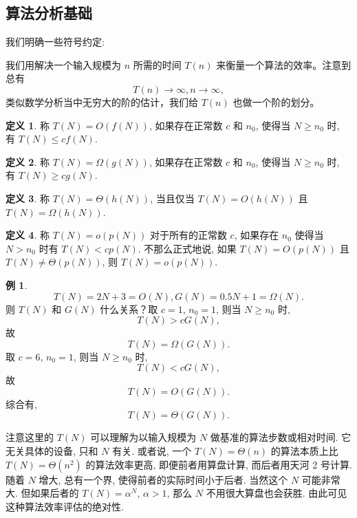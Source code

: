 \documentclass[a4paper]{ctexart}
\theoremstyle{definition}
\newtheorem{definition}{定义}[section]
\theoremstyle{definition}
\newtheorem{example}{例}[section]
\begin{document}

\subsection{算法分析基础}

我们明确一些符号约定:

我们用解决一个输入规模为 $n$ 所需的时间 $T(n)$ 来衡量一个算法的效率。注意到总有 
$$
T(n) \to \infty, n \to \infty,
$$
类似数学分析当中无穷大的阶的估计，我们给 $T(n)$ 也做一个阶的划分。

\begin{definition}
  称 $T(N) = O(f(N))$, 如果存在正常数 $c$ 和 $n_0$,
  使得当 $N \geq n_0$ 时, 有 $T(N) \leq cf(N)$.
\end{definition}

\begin{definition}
  称 $T(N) = \Omega(g(N))$, 如果存在正常数 $c$ 和 $n_0$,
  使得当 $N \geq n_0$ 时, 有 $T(N) \geq cg(N)$.  
\end{definition}

\begin{definition}
称 $T(N) = \Theta(h(N))$, 当且仅当 $T(N) = O(h(N))$ 且 $T(N) = \Omega(h(N))$.  
\end{definition}

\begin{definition}
  称 $T(N) = o(p(N))$ 对于所有的正常数 $c$,
  如果存在 $n_0$ 使得当 $N > n_0$ 时有 $T(N) < cp(N)$.
  不那么正式地说, 如果 $T(N) = O(p(N))$ 且 $T(N) \neq \Theta(p(N))$,
  则 $T(N) = o(p(N))$.
\end{definition}


\begin{example}
  \[
  T(N) = 2N + 3 = O(N),
  G(N) = 0.5N + 1 = \Omega(N).
  \]
  则 $T(N)$ 和 $G(N)$ 什么关系？取 $c = 1$, $n_0 = 1$, 则当 $N \geq n_0$ 时,
  \[
  T(N) > cG(N),
  \]
  故 
  \[
  T(N) = \Omega(G(N)).
  \]
  取 $c = 6$, $n_0 = 1$, 则当 $N \geq n_0$ 时,
  \[
  T(N) < cG(N),
  \]
  故
  \[
  T(N) = O(G(N)).
  \]
  综合有,
  \[
  T(N) = \Theta(G(N)).
  \]
\end{example}

注意这里的 $T(N)$ 可以理解为以输入规模为 $N$ 做基准的算法步数或相对时间.
它无关具体的设备, 只和 $N$ 有关. 或者说,
一个 $T(N) = \Theta(n)$ 的算法本质上比 $T(N) = \Theta(n^2)$ 的算法效率更高,
即便前者用算盘计算, 而后者用天河 2 号计算. 随着 $N$ 增大, 总有一个界,
使得前者的实际时间小于后者. 当然这个 $N$ 可能非常大. 但如果后者的
$T(N) = \alpha^N$, $\alpha > 1$, 那么 $N$ 不用很大算盘也会获胜.
由此可见这种算法效率评估的绝对性.
\end{document}
